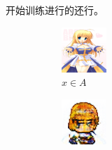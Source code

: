 \documentclass{beamer}
\begin{document}
\begin{frame}
开始训练进行的还行。
\begin{figure}[htb]
    \centering
    \begin{subfigure}[b]{0.23\linewidth}
        \includegraphics[width=\linewidth]{exp2_epoch060_real_A.png}
        \caption{$x \in A$}
      \end{subfigure}
      \begin{subfigure}[b]{0.23\linewidth}
        \includegraphics[width=\linewidth]{exp2_epoch060_fake_B.png}

\end{subfigure}
\end{figure}
\end{frame}
\end{document}
